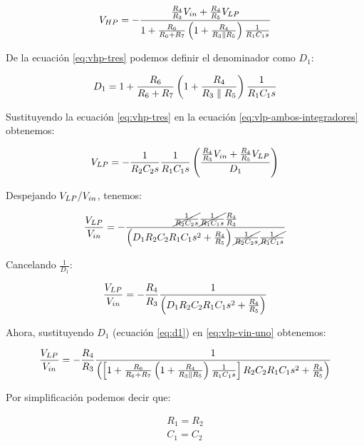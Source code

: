 \newcommand{\Denominador}{1 + \frac{R_6}{R_6 + R_7} \WrapParenthesis{1 + \frac{R_4}{R_3 \parallel R_5}}\frac{1}{R_1 C_1 s}}



\begin{equation}
    V_{HP} = - \frac{\frac{R_4}{R_3}V_{in} + \frac{R_4}{R_5}V_{LP}}{1 + \frac{R_6}{R_6 + R_7} \left( 1 + \frac{R_4}{R_3 \parallel R_5} \right)\frac{1}{R_1 C_1 s}}
    \label{eq:vhp-tres}
\end{equation}

De la ecuación \ref{eq:vhp-tres} podemos definir el denominador como $D_1$:

\begin{equation}
    D_1 = \Denominador
    \label{eq:d1}
\end{equation}



Sustituyendo la ecuación \ref{eq:vhp-tres} en la ecuación \ref{eq:vlp-ambos-integradores} obtenemos:

\begin{equation}
    V_{LP} = - \frac{1}{R_2 C_2 s} \frac{1}{R_1 C_1 s}\left( \frac{\frac{R_4}{R_3}V_{in} + \frac{R_4}{R_5}V_{LP}}{D_1} \right)
    \label{eq:vlp-ambos-integradores-sustituido}
\end{equation}

Despejando $V_{LP} / V_{in}$, tenemos:

\begin{equation}
    \frac{V_{LP}}{V_{in}} = - \frac{\cancel{\frac{1}{R_2 C_2 s}} \cancel{\frac{1}{R_1 C_1 s}} \frac{R_4}{R_3}}{\left( D_1 R_2 C_2 R_1 C_1 s^2 + \frac{R_4}{R_5} \right)\cancel{\frac{1}{R_2 C_2 s}} \cancel{\frac{1}{R_1 C_1 s}}}
\end{equation}

Cancelando $\frac{1}{D_1}$:

\begin{equation}
    \frac{V_{LP}}{V_{in}} = - \frac{R_4}{R_3}\frac{1}{\left( D_1 R_2 C_2 R_1 C_1 s^2 + \frac{R_4}{R_5} \right)}
    \label{eq:vlp-vin-uno}
\end{equation}

Ahora, sustituyendo $D_1$ (ecuación \ref{eq:d1}) en \ref{eq:vlp-vin-uno} obtenemos:

\begin{equation}
    \frac{\VLP}{\VIN} = - \frac{R_4}{R_3}\frac{1}{\WrapParenthesis{\WrapBrackets{\Denominador} R_2 C_2 R_1 C_1 s^2 + \frac{R_4}{R_5}}}
    \label{eq:vlp-vin-dos}
\end{equation}

Por simplificación podemos decir que:

\begin{align*}
    R_1 = R_2 \\
    C_1 = C_2
\end{align*}

